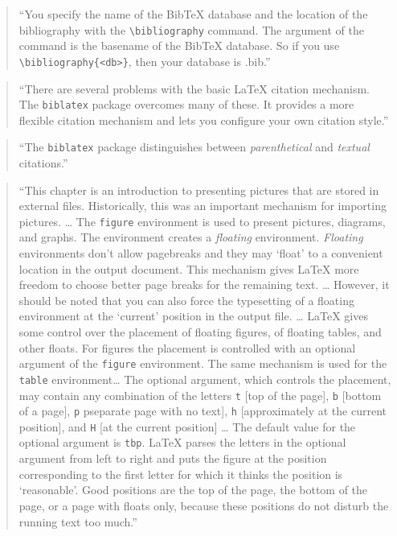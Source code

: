 \documentclass[]{tufte-book}
\begin{document}
\begin{quote}
``You specify the name of the BibTeX database and the location of the
bibliography with the \texttt{\textbackslash{}bibliography} command. The argument of the command
is the basename of the BibTeX database. So if you use \texttt{\textbackslash{}bibliography\{\textless{}db\textgreater{}\}},
then your database is .bib.'' \citep{van2012latex}
\end{quote}

\begin{quote}
``There are several problems with the basic LaTeX citation mechanism.
The \texttt{biblatex} package overcomes many of these. It provides a more flexible
citation mechanism and lets you configure your own citation style.''
\citep{van2012latex}
\end{quote}

\begin{quote}
``The \texttt{biblatex} package distinguishes between \emph{parenthetical} and
\emph{textual} citations.'' \citep{van2012latex}
\end{quote}

\begin{quote}
``This chapter is an introduction to presenting pictures that are stored in
external files. Historically, this was an important mechanism for importing
pictures. \ldots{} The \texttt{figure} environment is used to present pictures, diagrams,
and graphs. The environment creates a \emph{floating} environment. \emph{Floating}
environments don't allow pagebreaks and they may `float' to a convenient
location in the output document. This mechanism gives LaTeX more freedom to
choose better page breaks for the remaining text. \ldots{} However, it should be
noted that you can also force the typesetting of a floating environment at the
`current' position in the output file. \ldots{} LaTeX gives some control over the
placement of floating figures, of floating tables, and other floats. For figures
the placement is controlled with an optional argument of the \texttt{figure}
environment. The same mechanism is used for the \texttt{table} environment\ldots{} The
optional argument, which controls the placement, may contain any combination of
the letters \texttt{t} {[}top of the page{]}, \texttt{b} {[}bottom of a page{]}, \texttt{p} pseparate page
with no text{]}, \texttt{h} {[}approximately at the current position{]}, and \texttt{H} {[}at the
current position{]} \ldots{} The default value for the optional argument is \texttt{tbp}.
LaTeX parses the letters in the optional argument from left to right and puts
the figure at the position corresponding to the first letter for which it thinks
the position is `reasonable'. Good positions are the top of the page, the bottom
of the page, or a page with floats only, because these positions do not disturb
the running text too much.'' \citep{van2012latex}
\end{quote}
\end{document}

